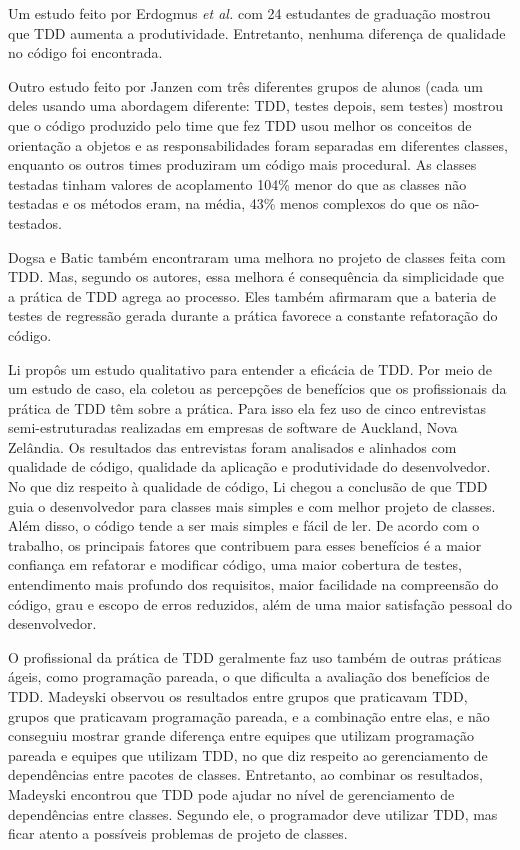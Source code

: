 \documentclass[conference]{IEEEtran}
\begin{document}
Um estudo feito por Erdogmus \textit{et al.} \cite{erdogmus-morisio} com 24 estudantes de
graduação mostrou que TDD aumenta a produtividade. Entretanto, nenhuma diferença 
de qualidade no código foi encontrada.

Outro estudo feito por Janzen \cite{janzen-saiedian} com três diferentes grupos
de alunos (cada um deles usando uma abordagem diferente: TDD, testes depois, sem
testes) mostrou que o código produzido pelo time que fez TDD usou melhor os
conceitos de orientação a objetos e as responsabilidades foram separadas em 
diferentes classes, enquanto os outros times produziram um código mais
procedural. 
As classes testadas tinham valores de acoplamento 104\% menor do 
que as classes não testadas e os métodos eram, na média, 43\% menos complexos 
do que os não-testados.

Dogsa e Batic \cite{dogsa-batic} também encontraram uma melhora no
projeto de classes feita com TDD. Mas, segundo os autores, essa melhora é 
consequência da simplicidade que a prática de TDD agrega ao processo. Eles
também  afirmaram que a bateria de testes de regressão gerada durante a prática 
favorece a constante refatoração do código.

Li \cite{angela-li} propôs um estudo qualitativo para
entender a eficácia de TDD. Por meio de um estudo de caso, ela coletou as 
percepções de benefícios que os profissionais da prática de TDD têm sobre a prática. Para isso ela
fez uso de cinco entrevistas semi-estruturadas realizadas em empresas de software de 
Auckland, Nova Zelândia. Os resultados das entrevistas foram analisados e alinhados
com qualidade de código,
qualidade da aplicação e produtividade do desenvolvedor.
No que diz respeito à qualidade de código, Li chegou a conclusão de
que TDD guia o desenvolvedor para classes mais simples e com melhor projeto de classes. 
Além disso, o código tende a ser mais simples e fácil de ler.
De acordo com o trabalho, os principais fatores que contribuem para esses benefícios
é a maior confiança em refatorar e modificar código, uma maior cobertura de testes,
entendimento mais profundo dos requisitos, maior facilidade na compreensão do código,
grau e escopo de erros reduzidos, além de uma maior satisfação pessoal do desenvolvedor.

O profissional da prática de TDD geralmente faz uso também de outras práticas ágeis, como
programação pareada, o que dificulta a avaliação dos benefícios
de TDD. Madeyski \cite{madeyski-package-dependencies} observou os resultados
entre grupos que praticavam TDD, grupos que praticavam programação pareada, 
e a combinação entre elas,
e não conseguiu mostrar grande diferença entre equipes que utilizam programação 
pareada e equipes que utilizam TDD, no que diz respeito ao gerenciamento de dependências entre 
pacotes de classes. Entretanto, ao combinar os resultados, Madeyski encontrou que TDD pode 
ajudar no nível de gerenciamento de dependências entre classes. Segundo ele, o 
programador deve utilizar TDD, mas ficar atento a possíveis problemas de projeto de classes.
\end{document}
